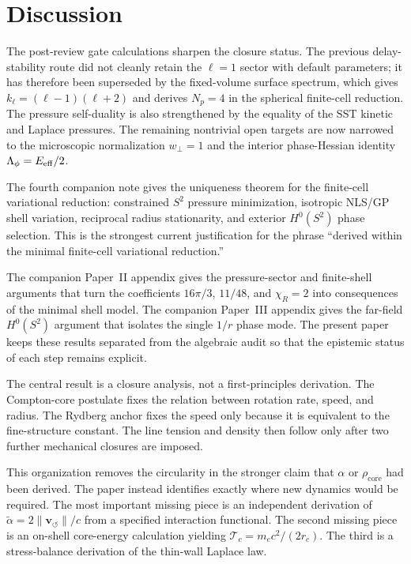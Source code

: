\documentclass[aps,pra,preprint,longbibliography,nofootinbib]{revtex4-2}
\newcommand{\vnorm}{\lVert\mathbf{v}_{\!\boldsymbol{\circlearrowleft}}\rVert} %
\begin{document}
\section{Discussion}

The post-review gate calculations sharpen the closure status.  The previous
delay-stability route did not cleanly retain the \(\ell=1\) sector with default
parameters; it has therefore been superseded by the fixed-volume surface
spectrum, which gives \(k_\ell=(\ell-1)(\ell+2)\) and derives
\(N_p=4\) in the spherical finite-cell reduction.  The pressure self-duality is
also strengthened by the equality of the SST kinetic and Laplace pressures.
The remaining nontrivial open targets are now narrowed to the microscopic
normalization \(w_\perp=1\) and the interior phase-Hessian identity
\(\Lambda_\phi=E_{\rm eff}/2\).


The fourth companion note gives the uniqueness theorem for the finite-cell
variational reduction: constrained \(S^2\) pressure minimization, isotropic
NLS/GP shell variation, reciprocal radius stationarity, and exterior
\(H^0(S^2)\) phase selection.  This is the strongest current justification for
the phrase ``derived within the minimal finite-cell variational reduction.''


The companion Paper~II appendix gives the pressure-sector and finite-shell
arguments that turn the coefficients \(16\pi/3\), \(11/48\), and
\(\chi_R=2\) into consequences of the minimal shell model.  The companion
Paper~III appendix gives the far-field \(H^0(S^2)\) argument that isolates the
single \(1/r\) phase mode.  The present paper keeps these results separated from
the algebraic audit so that the epistemic status of each step remains explicit.

\label{sec:discussion}

The central result is a closure analysis, not a first-principles
derivation.  The Compton-core postulate fixes the relation between
rotation rate, speed, and radius.  The Rydberg anchor fixes the speed
only because it is equivalent to the fine-structure constant.  The line
tension and density then follow only after two further mechanical
closures are imposed.

This organization removes the circularity in the stronger claim that
$\alpha$ or $\rho_{\mathrm{core}}$ had been derived.  The paper instead
identifies exactly where new dynamics would be required.  The most
important missing piece is an independent derivation of
$\tilde\alpha=2\vnorm/c$ from a specified interaction functional.  The
second missing piece is an on-shell core-energy calculation yielding
$\mathcal{T}_c=m_ec^2/(2r_c)$.  The third is a stress-balance derivation
of the thin-wall Laplace law.
\end{document}
